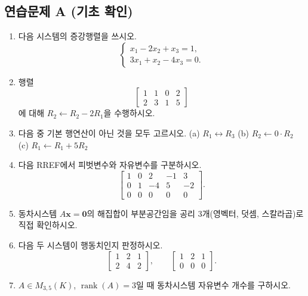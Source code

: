 \subsection*{연습문제 A (기초 확인)}
\begin{enumerate}[label=A-\arabic*.]
\item 다음 시스템의 증강행렬을 쓰시오.
\[
\begin{cases}
x_1-2x_2+x_3=1,\\
3x_1+x_2-4x_3=0.
\end{cases}
\]
\item 행렬
\[
\left[
\begin{array}{ccc|c}
1&1&0&2\\
2&3&1&5
\end{array}
\right]
\]
에 대해 $R_2\leftarrow R_2-2R_1$을 수행하시오.
\item 다음 중 기본 행연산이 아닌 것을 모두 고르시오.  
(a) $R_1\leftrightarrow R_3$ \quad (b) $R_2\leftarrow 0\cdot R_2$ \quad (c) $R_1\leftarrow R_1+5R_2$
\item 다음 RREF에서 피벗변수와 자유변수를 구분하시오.
\[
\left[
\begin{array}{cccc|c}
1&0&2&-1&3\\
0&1&-4&5&-2\\
0&0&0&0&0
\end{array}
\right].
\]
\item 동차시스템 $A\mathbf{x}=\mathbf{0}$의 해집합이 부분공간임을 공리 3개(영벡터, 덧셈, 스칼라곱)로 직접 확인하시오.
\item 다음 두 시스템이 행동치인지 판정하시오.
\[
\left[
\begin{array}{cc|c}
1&2&1\\
2&4&2
\end{array}
\right],\qquad
\left[
\begin{array}{cc|c}
1&2&1\\
0&0&0
\end{array}
\right].
\]
\item $A\in M_{3,5}(K)$, $\operatorname{rank}(A)=3$일 때 동차시스템 자유변수 개수를 구하시오.
\end{enumerate}

